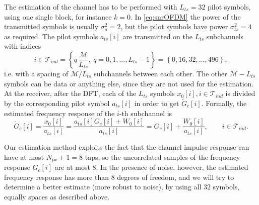 \documentclass[10pt]{article}
\newcommand{\ofdM} {\mathcal{M}}
\begin{document}
The estimation of the channel has to be performed with $L_{ts} = 32$ pilot symbols, using one single block, for instance $k=0$. In \eqref{eq:snrOFDM} the power of the transmitted symbols is usually $\sigma_a^2 = 2$, but the pilot symbols have power $\sigma_{ts}^2 = 4$ as required. The pilot symbols $a_{ts}[i]$ are transmitted on the $L_{ts}$ subchannels with indices
\begin{equation}
	i \in \mathcal{T}_{ind} = \left\{q \, \frac{\ofdM}{L_{ts}}, \ q = 0, 1, \ldots,L_{ts}-1 \right\}  = \left\{ 0, 16, 32, \dots, 496 \right\},
	\label{eq:OFDMequallyspacedindices}
\end{equation}
i.e. with a spacing of $\ofdM/L_{ts}$ subchannels between each other. The other $\ofdM - L_{ts}$ symbols can be data or anything else, since they are not used for the estimation. At the receiver, after the DFT, each of the $L_{ts}$ symbols $x_0[i], i \in \mathcal{T}_{ind}$ is divided by the corresponding pilot symbol $a_{ts}[i]$ in order to get $\tilde{G}_c[i]$. Formally, the estimated frequency response of the $i$-th subchannel is
\begin{equation}
	\tilde{G}_c[i] = \dfrac{x_0[i]}{a_{ts}[i]} = \dfrac{a_{ts}[i] G_c[i] + W_0[i]}{a_{ts}[i]} = G_c[i] + \dfrac{W_0[i]}{a_{ts}[i]}, \qquad i \in \mathcal{T}_{ind}.
\end{equation}

Our estimation method exploits the fact that the channel impulse response can have at most $N_{px} + 1 = 8$ taps, so the uncorrelated samples of the frequency response $G_c[i]$ are at most 8. In the presence of noise, however, the estimated frequency response has more than 8 degrees of freedom, and we will try to determine a better estimate (more robust to noise), by using all 32 symbols, equally spaces as described above.
\end{document}
